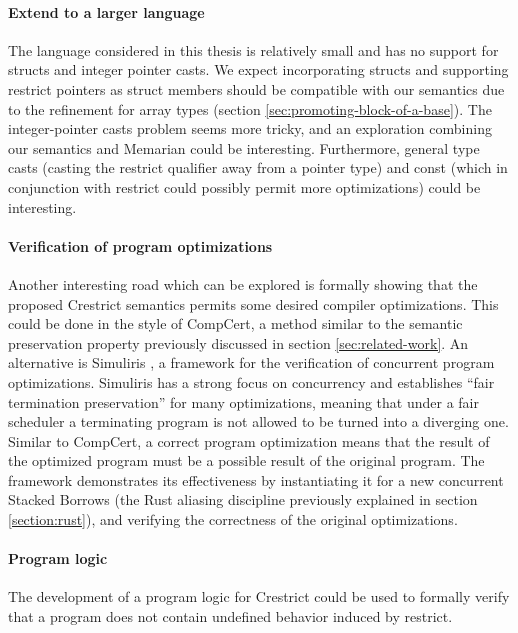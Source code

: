 \paragraph{Extend to a larger language}
The language considered in this thesis is relatively small and has no support for \eg structs and integer pointer casts.
We expect incorporating structs and supporting restrict pointers as struct members should be
compatible with our semantics due to the refinement for array types (section \ref{sec:promoting-block-of-a-base}).
The integer-pointer casts problem seems more tricky, and an exploration combining our semantics and Memarian \etall \cite{memarian2019exploring}
could be interesting.
Furthermore, general type casts (\eg casting the restrict qualifier away from a pointer type) and const (which in conjunction with
restrict could possibly permit more optimizations) could be interesting.

\paragraph{Verification of program optimizations}
Another interesting road which can be explored is formally showing that the
proposed Crestrict semantics permits some desired compiler optimizations.
This could be done in the style of CompCert, \ie a method similar to the semantic preservation property
previously discussed in section \ref{sec:related-work}.
An alternative is Simuliris \cite{gaher2022simuliris}, a framework for the verification of concurrent program optimizations.
Simuliris has a strong focus on concurrency and establishes ``fair termination preservation''
for many optimizations, meaning that under a fair scheduler a terminating program is not allowed to be
turned into a diverging one.
Similar to CompCert, a correct program optimization means that the result of the optimized
program must be a possible result of the original program.
The framework demonstrates its effectiveness by instantiating it for a new concurrent Stacked Borrows (the Rust aliasing discipline previously 
explained in section \ref{section:rust}), and verifying the correctness of the original optimizations.

\paragraph{Program logic} The development of a program logic for Crestrict could be used to
formally verify that a program does not contain undefined behavior induced by restrict.

